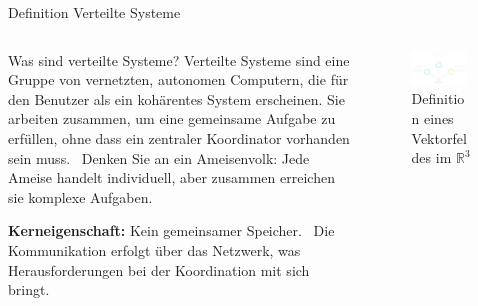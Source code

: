 \documentclass{beamer}
\begin{document}
\begin{frame}{Definition Verteilte Systeme}

    \begin{columns}[c] %

        \begin{column}{0.5\textwidth} %
            \begin{block}{Was sind verteilte Systeme?}
                Verteilte Systeme sind eine Gruppe von vernetzten, autonomen Computern, die für den Benutzer als ein kohärentes System erscheinen. Sie arbeiten zusammen, um eine gemeinsame Aufgabe zu erfüllen, ohne dass ein zentraler Koordinator vorhanden sein muss.  Denken Sie an ein Ameisenvolk: Jede Ameise handelt individuell, aber zusammen erreichen sie komplexe Aufgaben.
            \end{block}

            \textbf{Kerneigenschaft:} Kein gemeinsamer Speicher.  Die Kommunikation erfolgt über das Netzwerk, was Herausforderungen bei der Koordination mit sich bringt.
        \end{column}

        \begin{column}{0.5\textwidth} %
            \begin{figure}
                \centering
                \includegraphics[width=0.9\textwidth]{fig/Definition-VS.png} %
                \caption{Definition eines Vektorfeldes im $\mathbb{R}^3$}
            \end{figure}
        \end{column}
    \end{columns}

\end{frame}
\end{document}
